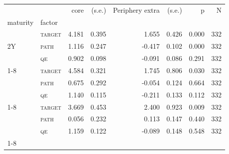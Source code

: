 \begin{tabular}{llrrrrrr}
\toprule
 &  & core & (s.e.) & Periphery extra & (s.e.) & p & N \\
maturity & factor &  &  &  &  &  &  \\
\midrule
\multirow[t]{3}{*}{2Y} & \textsc{target} & 4.181 & 0.395 & 1.655 & 0.426 & 0.000 & 332 \\
 & \textsc{path} & 1.116 & 0.247 & -0.417 & 0.102 & 0.000 & 332 \\
 & \textsc{qe} & 0.902 & 0.098 & -0.091 & 0.086 & 0.291 & 332 \\
\cline{1-8}
\multirow[t]{3}{*}{5Y} & \textsc{target} & 4.584 & 0.321 & 1.745 & 0.806 & 0.030 & 332 \\
 & \textsc{path} & 0.675 & 0.292 & -0.054 & 0.124 & 0.664 & 332 \\
 & \textsc{qe} & 1.140 & 0.115 & -0.211 & 0.133 & 0.112 & 332 \\
\cline{1-8}
\multirow[t]{3}{*}{10Y} & \textsc{target} & 3.669 & 0.453 & 2.400 & 0.923 & 0.009 & 332 \\
 & \textsc{path} & 0.056 & 0.232 & 0.113 & 0.147 & 0.440 & 332 \\
 & \textsc{qe} & 1.159 & 0.122 & -0.089 & 0.148 & 0.548 & 332 \\
\cline{1-8}
\bottomrule
\end{tabular}
